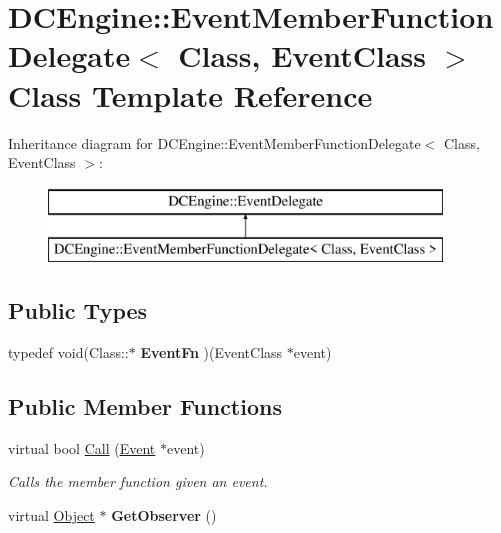 \hypertarget{classDCEngine_1_1EventMemberFunctionDelegate}{\section{D\-C\-Engine\-:\-:Event\-Member\-Function\-Delegate$<$ Class, Event\-Class $>$ Class Template Reference}
\label{classDCEngine_1_1EventMemberFunctionDelegate}
}
Inheritance diagram for D\-C\-Engine\-:\-:Event\-Member\-Function\-Delegate$<$ Class, Event\-Class $>$\-:\begin{figure}[H]
\begin{center}
\leavevmode
\includegraphics[height=2.000000cm]{classDCEngine_1_1EventMemberFunctionDelegate}
\end{center}
\end{figure}
\subsection*{Public Types}
\begin{DoxyCompactItemize}
\item 
\hypertarget{classDCEngine_1_1EventMemberFunctionDelegate_a2577ea290c6f4ba32a19998c3b250f85}{typedef void(Class\-::$\ast$ {\bfseries Event\-Fn} )(Event\-Class $\ast$event)}\label{classDCEngine_1_1EventMemberFunctionDelegate_a2577ea290c6f4ba32a19998c3b250f85}

\end{DoxyCompactItemize}
\subsection*{Public Member Functions}
\begin{DoxyCompactItemize}
\item 
virtual bool \hyperlink{classDCEngine_1_1EventMemberFunctionDelegate_a3ddc33b677eb96d0c7927473ab64ee0e}{Call} (\hyperlink{classDCEngine_1_1Event}{Event} $\ast$event)
\begin{DoxyCompactList}\small\item\em Calls the member function given an event. \end{DoxyCompactList}\item 
\hypertarget{classDCEngine_1_1EventMemberFunctionDelegate_a56b86bde8882c46860269ad78eba9191}{virtual \hyperlink{classDCEngine_1_1Object}{Object} $\ast$ {\bfseries Get\-Observer} ()}\label{classDCEngine_1_1EventMemberFunctionDelegate_a56b86bde8882c46860269ad78eba9191}

\end{DoxyCompactItemize}
